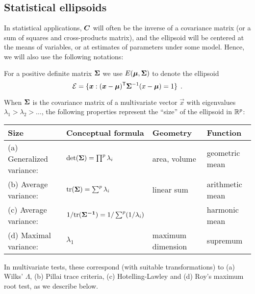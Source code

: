 \subsection{Statistical ellipsoids}
 
In statistical applications, $\bm{C}$ will often be the inverse of a covariance
matrix (or a sum of squares and cross-products matrix), and the ellipsoid will
be centered at the means of variables, or at estimates of parameters under some model.
Hence, we will also use the following notations:

For a positive definite matrix 
$\bm{\Sigma}$ we use $E(\bm{\mu},\bm{\Sigma})$ to denote the ellipsoid 
\begin{equation}\label{eq:ellipsoid3}
\mathcal{E} = \{ \bm{x} : (\bm{x}-\bm{\mu})^\mathsf{T} \bm{\Sigma}^{-1} (x-\bm{\mu}) = 1 \} \:\: .
 \end{equation} 

When $\bm{\Sigma}$ is the covariance matrix of a multivariate vector $\vec{x}$ with eigenvalues
$\lambda_1 > \lambda_2 > \dots$,
the following
properties represent the ``size'' of the ellipsoid in $\mathbb{R}^{p}$:

\begin{tabular}{llll}
    Size                   &  Conceptual formula                    & Geometry       & Function \\
\hline
(a) Generalized variance:  & $\mathrm{det} (\bm{\Sigma}) = \prod^p \lambda_i$ & area, volume & geometric mean\\
(b) Average variance:        & $\mathrm{tr} (\bm{\bm{\Sigma}}) = \sum^p \lambda_i $ & linear sum & arithmetic mean\\
(c) Average variance:        & $1/ \mathrm{tr} (\bm{\bm{\Sigma}^{-1}}) = 1/\sum^p (1/\lambda_i) $ &  & harmonic mean\\
(d) Maximal variance:      & $\lambda_1$ & maximum dimension & supremum
 \end{tabular}
\medskip

In multivariate tests, these correspond (with suitable transformations) to (a) Wilks' $\Lambda$,
(b) Pillai trace criteria, (c) Hotelling-Lawley   and (d) Roy's maximum root test, as we describe
below.

